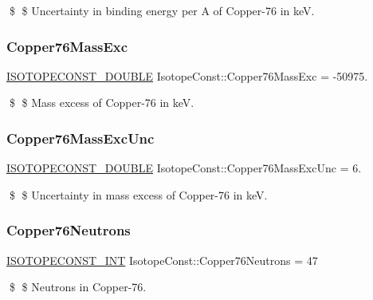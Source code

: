 \$ \$ Uncertainty in binding energy per A of Copper-\/76 in keV. \mbox{\label{group___isotope_const-_copper-_cu76_gaacc41bdb93ef1270a9eb960108132c03}} 
\subsubsection{\texorpdfstring{Copper76\+Mass\+Exc}{Copper76MassExc}}
{\footnotesize\ttfamily \mbox{\hyperlink{group___isotope_const-_macros_ga8f45a7272ce02c0b4c65c44636ed719a}{I\+S\+O\+T\+O\+P\+E\+C\+O\+N\+S\+T\+\_\+\+D\+O\+U\+B\+LE}} Isotope\+Const\+::\+Copper76\+Mass\+Exc = -\/50975.}

\$ \$ Mass excess of Copper-\/76 in keV. \mbox{\label{group___isotope_const-_copper-_cu76_gaeede656b670ca67d618cb6f5d8c5bdb4}} 
\subsubsection{\texorpdfstring{Copper76\+Mass\+Exc\+Unc}{Copper76MassExcUnc}}
{\footnotesize\ttfamily \mbox{\hyperlink{group___isotope_const-_macros_ga8f45a7272ce02c0b4c65c44636ed719a}{I\+S\+O\+T\+O\+P\+E\+C\+O\+N\+S\+T\+\_\+\+D\+O\+U\+B\+LE}} Isotope\+Const\+::\+Copper76\+Mass\+Exc\+Unc = 6.}

\$ \$ Uncertainty in mass excess of Copper-\/76 in keV. \mbox{\label{group___isotope_const-_copper-_cu76_ga1ab7667528a78de88923a735720492e1}} 
\subsubsection{\texorpdfstring{Copper76\+Neutrons}{Copper76Neutrons}}
{\footnotesize\ttfamily \mbox{\hyperlink{group___isotope_const-_macros_ga5f18360b3e99483a35c32d789e62621c}{I\+S\+O\+T\+O\+P\+E\+C\+O\+N\+S\+T\+\_\+\+I\+NT}} Isotope\+Const\+::\+Copper76\+Neutrons = 47}

\$ \$ Neutrons in Copper-\/76. \mbox{\label{group___isotope_const-_copper-_cu76_ga106fd57f9e65108021e1ef5addf8d864}} 
